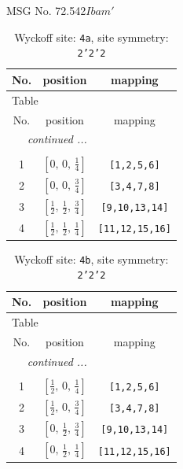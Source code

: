 \documentclass[fleqn,8pt]{jsarticle}
\begin{document}
\setcounter{MaxMatrixCols}{32}

\renewcommand{\tablename}{Table~}
\renewcommand{\figurename}{Figure~}
\begin{center}
\LARGE
MSG No. 72.542\quad$Ibam'$
\end{center}
\renewcommand{\arraystretch}{1.2}
\begin{longtable}{ccc}
\caption{Wyckoff site: {\tt 4a}, site symmetry: {\tt 2'2'2}}
 \\
 \hline \hline
No. & position & mapping \\ \hline \endfirsthead

\multicolumn{2}{l}{\tablename\ \thetable{}} \\
 \hline \hline
No. & position & mapping \\ \hline \endhead

 \hline \hline
\multicolumn{2}{r}{\footnotesize\it continued ...} \\ \endfoot

 \hline \hline
\multicolumn{2}{r}{} \\ \endlastfoot

1 & $\left[ 0,\, 0,\, \frac{1}{4} \right]$ & {\tt [1,2,5,6]} \\ \hline
2 & $\left[ 0,\, 0,\, \frac{3}{4} \right]$ & {\tt [3,4,7,8]} \\ \hline
3 & $\left[ \frac{1}{2},\, \frac{1}{2},\, \frac{3}{4} \right]$ & {\tt [9,10,13,14]} \\ \hline
4 & $\left[ \frac{1}{2},\, \frac{1}{2},\, \frac{1}{4} \right]$ & {\tt [11,12,15,16]} \\
\end{longtable}
\renewcommand{\arraystretch}{1.2}
\begin{longtable}{ccc}
\caption{Wyckoff site: {\tt 4b}, site symmetry: {\tt 2'2'2}}
 \\
 \hline \hline
No. & position & mapping \\ \hline \endfirsthead

\multicolumn{2}{l}{\tablename\ \thetable{}} \\
 \hline \hline
No. & position & mapping \\ \hline \endhead

 \hline \hline
\multicolumn{2}{r}{\footnotesize\it continued ...} \\ \endfoot

 \hline \hline
\multicolumn{2}{r}{} \\ \endlastfoot

1 & $\left[ \frac{1}{2},\, 0,\, \frac{1}{4} \right]$ & {\tt [1,2,5,6]} \\ \hline
2 & $\left[ \frac{1}{2},\, 0,\, \frac{3}{4} \right]$ & {\tt [3,4,7,8]} \\ \hline
3 & $\left[ 0,\, \frac{1}{2},\, \frac{3}{4} \right]$ & {\tt [9,10,13,14]} \\ \hline
4 & $\left[ 0,\, \frac{1}{2},\, \frac{1}{4} \right]$ & {\tt [11,12,15,16]} \\
\end{longtable}
\end{document}

